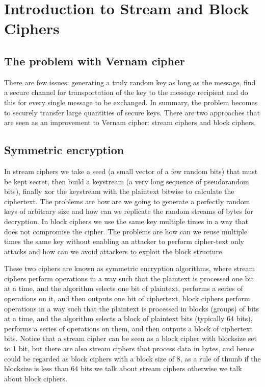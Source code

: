 \chapter{Introduction to Stream and Block Ciphers}

\section{The problem with Vernam cipher}

There are few issues: generating a truly random key as long as the message, find a secure channel for transportation of the key to the message recipient and do this for every single message to be exchanged. In summary, the problem becomes to securely transfer large quantities of secure keys. There are two approaches that are seen as an improvement to Vernam cipher: stream ciphers and block ciphers.


\section{Symmetric encryption}
In stream ciphers we take a seed (a small vector of a few random bits) that must be kept secret, then build a keystream (a very long sequence of pseudorandom bits), finally xor the keystream with the plaintext bitwise to calculate the ciphertext. The problems are how are we going to generate a perfectly random keys of arbitrary size and how can we replicate the random streams of bytes for decryption.
In block ciphers we use the same key multiple times in a way that does not compromise the cipher. The problems are how can we reuse multiple times the same key without enabling an attacker to perform cipher-text only attacks and how can we avoid attackers to exploit the block structure.

These two ciphers are known as symmetric encryption algorithms, where stream ciphers perform operations in a way such that the plaintext is processed one bit at a time, and the algorithm selects one bit of plaintext, performs a series of operations on it, and then outputs one bit of ciphertext, block ciphers perform operations in a way such that the plaintext is processed in blocks (groups) of bits at a time, and the algorithm selects a block of plaintext bits (typically 64 bits), performs a series of operations on them, and then outputs a block of ciphertext bits.
Notice that a stream cipher can be seen as a block cipher with blocksize set to 1 bit, but there are also stream ciphers that process data in bytes, and hence could be regarded as block ciphers with a block size of 8, as a rule of thumb if the blocksize is less than 64 bits we talk about stream ciphers otherwise we talk about block ciphers.


